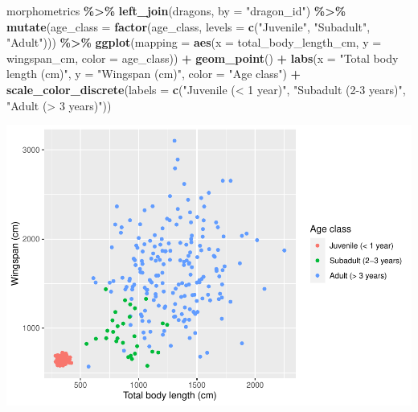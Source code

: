\documentclass[
]{book}
\newenvironment{Shaded}{\begin{snugshade}}{\end{snugshade}}
\newcommand{\AttributeTok}[1]{\textcolor[rgb]{0.13,0.29,0.53}{#1}}
\newcommand{\FunctionTok}[1]{\textcolor[rgb]{0.13,0.29,0.53}{\textbf{#1}}}
\newcommand{\NormalTok}[1]{#1}
\newcommand{\SpecialCharTok}[1]{\textcolor[rgb]{0.81,0.36,0.00}{\textbf{#1}}}
\newcommand{\StringTok}[1]{\textcolor[rgb]{0.31,0.60,0.02}{#1}}
\begin{document}
\begin{Shaded}
\begin{Highlighting}[]
\NormalTok{morphometrics }\SpecialCharTok{\%\textgreater{}\%} 
  \FunctionTok{left\_join}\NormalTok{(dragons, }\AttributeTok{by =} \StringTok{"dragon\_id"}\NormalTok{) }\SpecialCharTok{\%\textgreater{}\%} 
  \FunctionTok{mutate}\NormalTok{(}\AttributeTok{age\_class =} \FunctionTok{factor}\NormalTok{(age\_class, }\AttributeTok{levels =} \FunctionTok{c}\NormalTok{(}\StringTok{"Juvenile"}\NormalTok{,}
                                                  \StringTok{"Subadult"}\NormalTok{,}
                                                  \StringTok{"Adult"}\NormalTok{))) }\SpecialCharTok{\%\textgreater{}\%} 
\FunctionTok{ggplot}\NormalTok{(}\AttributeTok{mapping =} \FunctionTok{aes}\NormalTok{(}\AttributeTok{x =}\NormalTok{ total\_body\_length\_cm, }\AttributeTok{y =}\NormalTok{ wingspan\_cm, }\AttributeTok{color =}\NormalTok{ age\_class)) }\SpecialCharTok{+}
  \FunctionTok{geom\_point}\NormalTok{() }\SpecialCharTok{+}
  \FunctionTok{labs}\NormalTok{(}\AttributeTok{x =} \StringTok{"Total body length (cm)"}\NormalTok{, }\AttributeTok{y =} \StringTok{"Wingspan (cm)"}\NormalTok{, }\AttributeTok{color =} \StringTok{"Age class"}\NormalTok{) }\SpecialCharTok{+}
  \FunctionTok{scale\_color\_discrete}\NormalTok{(}\AttributeTok{labels =} \FunctionTok{c}\NormalTok{(}\StringTok{"Juvenile (\textless{} 1 year)"}\NormalTok{,}
                                 \StringTok{"Subadult (2{-}3 years)"}\NormalTok{,}
                                 \StringTok{"Adult (\textgreater{} 3 years)"}\NormalTok{)) }
\end{Highlighting}
\end{Shaded}

\includegraphics{reproducible-science_files/figure-latex/gg11-1.pdf}
\end{document}
